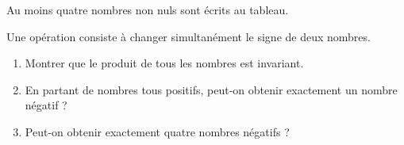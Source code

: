 Au moins quatre nombres non nuls sont écrits au tableau.

Une opération consiste à changer simultanément le signe de deux nombres.
\begin{enumerate}
  \item Montrer que le produit de tous les nombres est invariant.
  \item En partant de nombres tous positifs, peut-on obtenir exactement un
  nombre négatif ?
  \item Peut-on obtenir exactement quatre nombres négatifs ?
\end{enumerate}
